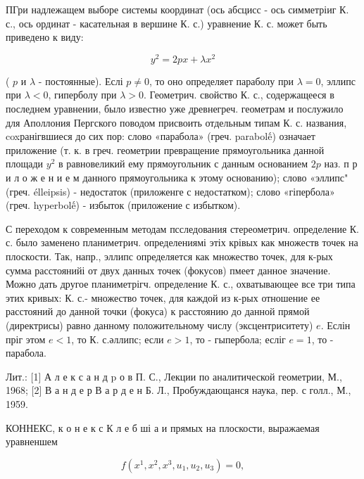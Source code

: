 \documentclass[10pt]{article}
\begin{document}
ПГри надлежащем выборе системы координат (ось абсцисс - ось симметріиг К. с., ось ординат - касательная в вершине К. с.) уравнение К. с. может быть приведено к виду:



\[

y^{2}=2 p x+\lambda x^{2}

\]



( $p$ и $\lambda$ - постоянные). Еслі $p \neq 0$, то оно определяет параболу при $\lambda=0$, эллипс при $\lambda<0$, гиперболу при $\lambda>0$. Геометрич. свойство К. с., содержащееся в последнем уравнении, было известно уже древнегреч. геометрам и послужило для Аполлония Пергского поводом присвоить отдельным типам К. с. названия, coxранігвшиеся до сих пор: слово «парабола» (греч. parabolế) означает приложение (т. к. в греч. геометрии превращение прямоугольника данной площади $y^{2}$ в равновеликий ему прямоугольник с данным основанием $2 p$ наз. п р и л о ж е н и е м данного прямоугольника к этому основанию); слово «эллипс" (греч. élleipsis) - недостаток (приложенге с недостатком); слово «гіпербола» (греч. hyperbolế) - избыток (приложение с избытком).



С переходом к современным методам псследования стереометрич. определение К. с. было заменено планиметрич. определениямі этіх крівых как множеств точек на плоскости. Так, напр., эллипс определяется как множество точек, для к-рых сумма расстоянийі от двух данных точек (фокусов) пмеет данное значение. Можно дать другое планиметрігч. определение К. с., охватывающее все три типа этих кривых: К. с.- множество точек, для каждой из к-рых отношение ее расстояний до данной точки (фокуса) к расстоянию до данной прямой (директрисы) равно данному положительному числу (эксцентриситету) $e$. Еслін пріг этом $e<1$, то К. с.әллипс; если $e>1$, то - гыпербола; есліг $e=1$, то - парабола.



Лит.: [1] А л е к с а н д p о в П. С., Лекции по аналитической геометрии, М., 1968; [2] В а н д е р В а р д е н Б. Л., Пробуждающанся наука, пер. с голл., М., 1959.



КОННЕКС, к о н е к с К л е б ші а и прямых на плоскости, выражаемая уравненшем



\[

f\left(x^{1}, x^{2}, x^{3}, u_{1}, u_{2}, u_{3}\right)=0,

\]
\end{document}
